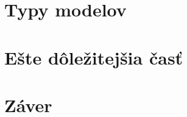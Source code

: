 \documentclass[10pt,twoside,slovak,a4paper]{article}
\begin{document}
\section{Typy modelov} \label{dolezita}

\section{Ešte dôležitejšia časť} \label{dolezitejsia}



\section{Záver} \label{zaver} %






\end{document}
